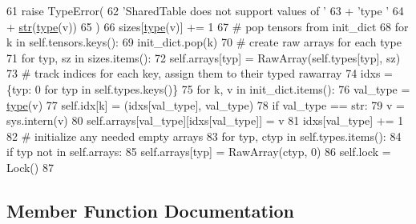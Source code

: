 \begin{DoxyCode}
61                     \textcolor{keywordflow}{raise} TypeError(
62                         \textcolor{stringliteral}{'SharedTable does not support values of '}
63                         + \textcolor{stringliteral}{'type '}
64                         + \hyperlink{namespacegenerate__task__READMEs_a5b88452ffb87b78c8c85ececebafc09f}{str}(\hyperlink{namespaceparlai_1_1agents_1_1tfidf__retriever_1_1build__tfidf_ad5dfae268e23f506da084a9efb72f619}{type}(v))
65                     )
66                 sizes[\hyperlink{namespaceparlai_1_1agents_1_1tfidf__retriever_1_1build__tfidf_ad5dfae268e23f506da084a9efb72f619}{type}(v)] += 1
67             \textcolor{comment}{# pop tensors from init\_dict}
68             \textcolor{keywordflow}{for} k \textcolor{keywordflow}{in} self.tensors.keys():
69                 init\_dict.pop(k)
70             \textcolor{comment}{# create raw arrays for each type}
71             \textcolor{keywordflow}{for} typ, sz \textcolor{keywordflow}{in} sizes.items():
72                 self.arrays[typ] = RawArray(self.types[typ], sz)
73             \textcolor{comment}{# track indices for each key, assign them to their typed rawarray}
74             idxs = \{typ: 0 \textcolor{keywordflow}{for} typ \textcolor{keywordflow}{in} self.types.keys()\}
75             \textcolor{keywordflow}{for} k, v \textcolor{keywordflow}{in} init\_dict.items():
76                 val\_type = \hyperlink{namespaceparlai_1_1agents_1_1tfidf__retriever_1_1build__tfidf_ad5dfae268e23f506da084a9efb72f619}{type}(v)
77                 self.idx[k] = (idxs[val\_type], val\_type)
78                 \textcolor{keywordflow}{if} val\_type == str:
79                     v = sys.intern(v)
80                 self.arrays[val\_type][idxs[val\_type]] = v
81                 idxs[val\_type] += 1
82         \textcolor{comment}{# initialize any needed empty arrays}
83         \textcolor{keywordflow}{for} typ, ctyp \textcolor{keywordflow}{in} self.types.items():
84             \textcolor{keywordflow}{if} typ \textcolor{keywordflow}{not} \textcolor{keywordflow}{in} self.arrays:
85                 self.arrays[typ] = RawArray(ctyp, 0)
86         self.lock = Lock()
87 
\end{DoxyCode}


\subsection{Member Function Documentation}
\mbox{\label{classparlai_1_1utils_1_1thread_1_1SharedTable_afac82c3717ad0344c5bdfc7b8913d796}} 
